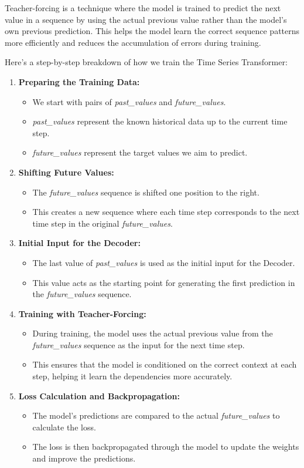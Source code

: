 Teacher-forcing is a technique where the model is trained to predict the next value in a sequence by using the actual previous value rather than the model's own previous prediction. This helps the model learn the correct sequence patterns more efficiently and reduces the accumulation of errors during training.

Here's a step-by-step breakdown of how we train the Time Series Transformer:
\begin{enumerate}
    \item \textbf{Preparing the Training Data:}
    \begin{itemize}
        \item We start with pairs of \textit{past\_values} and \textit{future\_values}.
        \item \textit{past\_values} represent the known historical data up to the current time step.
        \item \textit{future\_values} represent the target values we aim to predict.
    \end{itemize}
    \item \textbf{Shifting Future Values:}
    \begin{itemize}
        \item The \textit{future\_values} sequence is shifted one position to the right.
        \item This creates a new sequence where each time step corresponds to the next time step in the original \textit{future\_values}.
    \end{itemize}
    \item \textbf{Initial Input for the Decoder:}
    \begin{itemize}
        \item The last value of \textit{past\_values} is used as the initial input for the Decoder.
        \item This value acts as the starting point for generating the first prediction in the \textit{future\_values} sequence.
    \end{itemize}
    \item \textbf{Training with Teacher-Forcing:}
    \begin{itemize}
        \item During training, the model uses the actual previous value from the \textit{future\_values} sequence as the input for the next time step.
        \item This ensures that the model is conditioned on the correct context at each step, helping it learn the dependencies more accurately.
    \end{itemize}
    \item \textbf{Loss Calculation and Backpropagation:}
    \begin{itemize}
        \item The model's predictions are compared to the actual \textit{future\_values} to calculate the loss.
        \item The loss is then backpropagated through the model to update the weights and improve the predictions.
    \end{itemize}
\end{enumerate}

